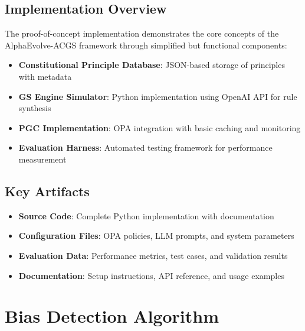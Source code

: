 \documentclass[sigconf,natbib]{acmart}
\begin{document}
\subsection{Implementation Overview}
The proof-of-concept implementation demonstrates the core concepts of the AlphaEvolve-ACGS framework through simplified but functional components:

\begin{itemize}
    \item \textbf{Constitutional Principle Database}: JSON-based storage of principles with metadata
    \item \textbf{GS Engine Simulator}: Python implementation using OpenAI API for rule synthesis
    \item \textbf{PGC Implementation}: OPA integration with basic caching and monitoring
    \item \textbf{Evaluation Harness}: Automated testing framework for performance measurement
\end{itemize}

\subsection{Key Artifacts}
\begin{itemize}
    \item \textbf{Source Code}: Complete Python implementation with documentation
    \item \textbf{Configuration Files}: OPA policies, LLM prompts, and system parameters
    \item \textbf{Evaluation Data}: Performance metrics, test cases, and validation results
    \item \textbf{Documentation}: Setup instructions, API reference, and usage examples
\end{itemize}

\section{Bias Detection Algorithm}
\label{app:bias_detection_algorithm}
\end{document}
